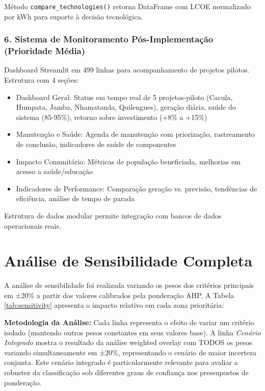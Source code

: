 \documentclass[12pt, a4paper]{article}
\begin{document}
Método \texttt{compare\_technologies()} retorna DataFrame com LCOE normalizado por kWh para suporte à decisão tecnológica.

\subsubsection{6. Sistema de Monitoramento Pós-Implementação (Prioridade Média)}

Dashboard Streamlit em 499 linhas para acompanhamento de projetos pilotos. Estrutura com 4 seções:

\begin{itemize}
    \item Dashboard Geral: Status em tempo real de 5 projetos-piloto (Cacula, Humpata, Jamba, Nhamatanda, Quilengues), geração diária, saúde do sistema (85-95\%), retorno sobre investimento (+8\% a +15\%)
    \item Manutenção e Saúde: Agenda de manutenção com priorização, rastreamento de conclusão, indicadores de saúde de componentes
    \item Impacto Comunitário: Métricas de população beneficiada, melhorias em acesso a saúde/educação
    \item Indicadores de Performance: Comparação geração vs. previsão, tendências de eficiência, análise de tempo de parada
\end{itemize}

Estrutura de dados modular permite integração com bancos de dados operacionais reais.

\section{Análise de Sensibilidade Completa}

A análise de sensibilidade foi realizada variando os pesos dos critérios principais em ±20\% a partir dos valores calibrados pela ponderação AHP. A Tabela \ref{tab:sensitivity} apresenta o impacto relativo em cada zona prioritária:

\textbf{Metodologia da Análise:} Cada linha representa o efeito de variar um critério isolado (mantendo outros pesos constantes em seus valores base). A linha \textit{Cenário Integrado} mostra o resultado da análise weighted overlay com TODOS os pesos variando simultaneamente em ±20\%, representando o cenário de maior incerteza conjunta. Este cenário integrado é particularmente relevante para avaliar a robustez da classificação sob diferentes graus de confiança nos pressupostos de ponderação.
\end{document}
